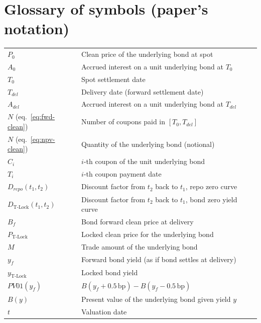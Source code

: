 \documentclass[11pt,a4paper]{article}
\begin{document}
\section{Glossary of symbols (paper's notation)}
\begin{tabular}{@{}p{3cm}p{12cm}@{}}
\toprule
$P_0$                                 & Clean price of the underlying bond at spot \\
$A_0$                                 & Accrued interest on a unit underlying bond at $T_0$ \\
$T_0$                                 & Spot settlement date \\
$T_{del}$                             & Delivery date (forward settlement date) \\
$A_{del}$                             & Accrued interest on a unit underlying bond at $T_{del}$ \\
$N$ (eq.~\ref{eq:fwd-clean})          & Number of coupons paid in $[T_0, T_{del}]$ \\
$N$ (eq.~\ref{eq:npv-clean})          & Quantity of the underlying bond (notional) \\
$C_i$                                 & $i$-th coupon of the unit underlying bond \\
$T_i$                                 & $i$-th coupon payment date \\
$D_{repo}(t_1, t_2)$                  & Discount factor from $t_2$ back to $t_1$, repo zero curve \\
$D_{\text{T-Lock}}(t_1, t_2)$         & Discount factor from $t_2$ back to $t_1$, bond zero yield curve \\
$B_f$                                 & Bond forward clean price at delivery \\
$P_{\text{T-Lock}}$                   & Locked clean price for the underlying bond \\
$M$                                   & Trade amount of the underlying bond \\
$y_f$                                 & Forward bond yield (as if bond settles at delivery) \\
$y_{\text{T-Lock}}$                   & Locked bond yield \\
$PV01(y_f)$                           & $B(y_f + 0.5\,\text{bp}) - B(y_f - 0.5\,\text{bp})$ \\
$B(y)$                                & Present value of the underlying bond given yield $y$ \\
$t$                                   & Valuation date \\
\bottomrule
\end{tabular}
\end{document}
